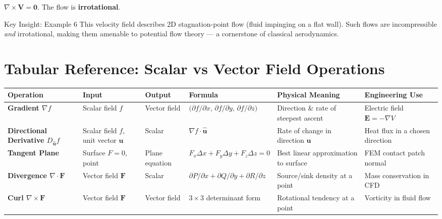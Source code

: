 \documentclass[12pt,a4paper]{article}
\begin{document}
$\nabla \times \mathbf{V} = \mathbf{0}$. The flow is \textbf{irrotational}.

\begin{learnbox}{Key Insight: Example 6}
This velocity field describes 2D stagnation-point flow (fluid impinging on a flat wall). Such flows are incompressible \emph{and} irrotational, making them amenable to potential flow theory --- a cornerstone of classical aerodynamics.
\end{learnbox}

\section{Tabular Reference: Scalar vs Vector Field Operations}

\begin{center}
\begin{tabular}{>{\bfseries}p{3cm} p{2.5cm} p{1.8cm} p{3.5cm} p{2.5cm} p{2.5cm}}
\toprule
Operation & Input & Output & Formula & Physical Meaning & Engineering Use \\
\midrule
Gradient $\nabla f$ &
Scalar field $f$ &
Vector field &
$\bigl(\partial f/\partial x,\, \partial f/\partial y,\, \partial f/\partial z\bigr)$ &
Direction \& rate of steepest ascent &
Electric field $\mathbf{E} = -\nabla V$ \\[6pt]
Directional Derivative $D_{\hat{\mathbf{u}}} f$ &
Scalar field $f$, unit vector $\hat{\mathbf{u}}$ &
Scalar &
$\nabla f \cdot \hat{\mathbf{u}}$ &
Rate of change in direction $\hat{\mathbf{u}}$ &
Heat flux in a chosen direction \\[6pt]
Tangent Plane &
Surface $F=0$, point &
Plane equation &
$F_x \Delta x + F_y \Delta y + F_z \Delta z = 0$ &
Best linear approximation to surface &
FEM contact patch normal \\[6pt]
Divergence $\nabla \cdot \mathbf{F}$ &
Vector field $\mathbf{F}$ &
Scalar &
$\partial P/\partial x + \partial Q/\partial y + \partial R/\partial z$ &
Source/sink density at a point &
Mass conservation in CFD \\[6pt]
Curl $\nabla \times \mathbf{F}$ &
Vector field $\mathbf{F}$ &
Vector field &
$3\times 3$ determinant form &
Rotational tendency at a point &
Vorticity in fluid flow \\
\bottomrule
\end{tabular}
\end{center}
\end{document}
